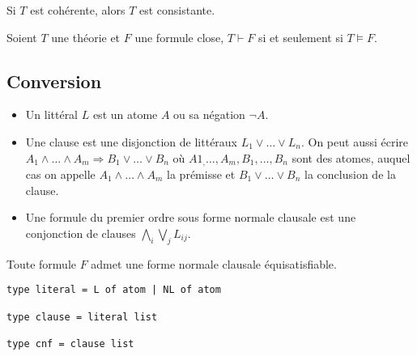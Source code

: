 \documentclass[9pt]{beamer}
\begin{document}
\begin{frame}
\begin{theorem}
  Si $T$ est cohérente, alors $T$ est consistante.
\end{theorem}

\begin{theorem}
  Soient $T$ une théorie et $F$ une formule close, $T\vdash F$ si et seulement si $T\models F$.
\end{theorem}
\end{frame}

\subsection{Conversion}

\begin{frame}[fragile]
\begin{definition}
  \begin{itemize}
  \item Un littéral $L$ est un atome $A$ ou sa négation $\neg A$.
  \item Une clause est une disjonction de littéraux $L_1\vee\dots\vee L_n$. On peut aussi écrire $A_1\wedge\dots\wedge A_m\Rightarrow B_1\vee\dots\vee B_n$ où $A1_,\dots,A_m,B_1,\dots,B_n$ sont des atomes, auquel cas on appelle $A_1\wedge\dots\wedge A_m$ la prémisse et $B_1\vee\dots\vee B_n$ la conclusion de la clause.
  \item Une formule du premier ordre sous forme normale clausale est une conjonction de clauses $\bigwedge_i\bigvee_j L_{ij}$.
\end{itemize}
\end{definition}

\begin{theorem}
  Toute formule $F$ admet une forme normale clausale équisatisfiable.
\end{theorem}

\begin{lstlisting}
type literal = L of atom | NL of atom

type clause = literal list

type cnf = clause list
\end{lstlisting}
\end{frame}
\end{document}
